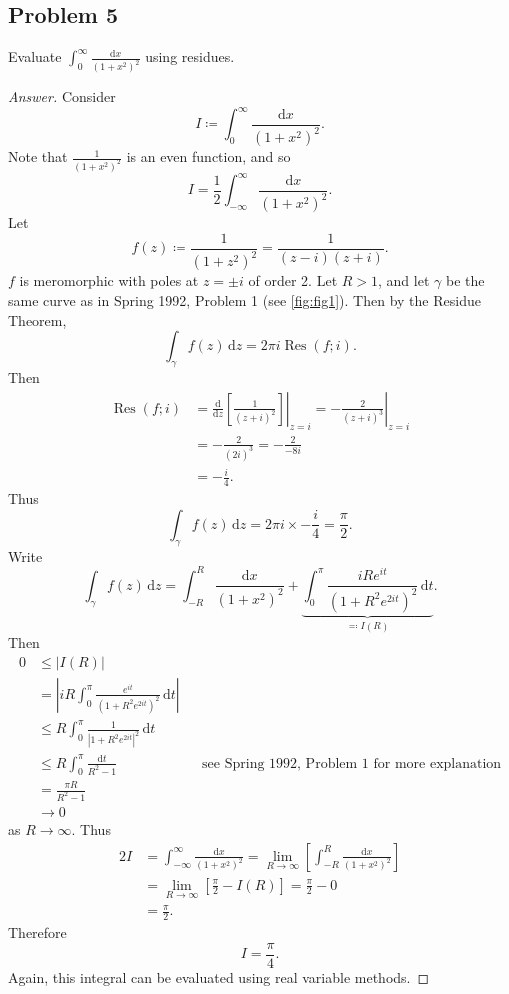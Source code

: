 \documentclass[12pt]{article}
\newcommand\paren[1]{\left( #1 \right)}
\newcommand{\sqbrack}[1]{\left [ #1 \right ]}
\theoremstyle{definition}
\DeclareMathOperator\Res{Res}
\begin{document}
\subsection{Problem 5}
Evaluate $\displaystyle \int_0^{\infty} \frac{\mathrm{d}x}{(1+x^2)^2}$ using residues.
\begin{proof}[Answer]
    Consider 
    \[
        I \coloneqq \int_0^{\infty} \frac{ \mathrm{d}x }{ \paren{ 1 + x^2 }^2 }.
    \]
    Note that $\frac{1}{ \paren{ 1 + x^2 }^2 }$ is an even function, and so 
    \[
        I = \frac{1}{2} \int_{-\infty}^{\infty} \frac{ \mathrm{d}x }{ \paren{ 1 + x^2 }^2 }.
    \]
    Let 
    \[
        f(z) \coloneqq \frac{1}{ \paren{ 1 + z^2 }^2 } = \frac{1}{(z - i)(z + i)}.
    \]
    $f$ is meromorphic with poles at $z = \pm i$ of order 2. Let $R > 1$, and let $\gamma$ be the same curve as in Spring 1992, Problem 1 (see \ref{fig:fig1}). Then by the Residue Theorem,
    \[
        \int_{\gamma} f(z) \, \mathrm{d}z = 2\pi i \Res(f;i).
    \]
    Then 
    \begin{align*}
        \Res(f;i) & = \frac{ \mathrm{d} }{ \mathrm{d} z} \left. \sqbrack{ \frac{1}{(z+i)^2} } \right|_{ z = i } = \left. -\frac{2}{(z+i)^3} \right|_{z = i} \\
        & = -\frac{2}{(2i)^3} = -\frac{2}{-8i} \\
        & = -\frac{i}{4}.
    \end{align*}
    Thus 
    \[
        \int_{\gamma} f(z) \, \mathrm{d}z = 2\pi i \times -\frac{i}{4} = \frac{\pi}{2}.
    \]
    Write
    \[
        \int_{\gamma} f(z) \, \mathrm{d}z = \int_{-R}^R \frac{ \mathrm{d}x }{ \paren{ 1 + x^2 }^2 } + \underbrace{ \int_0^{\pi} \frac{ iRe^{it} }{ \paren{ 1 + R^2e^{2it} }^2 } \, \mathrm{d}t }_{ \eqqcolon I(R) }.
    \]
    Then 
    \begin{align*}
        0 & \leq |I(R)| \\
        & = \left| iR \int_0^{\pi} \frac{ e^{it} }{ \paren{ 1 + R^2e^{2it} }^2 } \, \mathrm{d}t \right| \\
        & \leq R \int_0^{\pi} \frac{1}{ \left| 1 + R^2e^{2it} \right|^2 } \, \mathrm{d}t \\
        & \leq R \int_0^{\pi} \frac{ \mathrm{d}t }{R^2 - 1} && \text{see Spring 1992, Problem 1 for more explanation} \\
        & = \frac{ \pi R }{ R^2 - 1 } \\
        & \to 0
    \end{align*}
    as $R \to \infty$. Thus 
    \begin{align*}
        2I & = \int_{-\infty}^{\infty} \frac{ \mathrm{d}x }{ \paren{ 1 + x^2 }^2 } = \lim\limits_{R \to \infty} \sqbrack{ \int_{-R}^R \frac{ \mathrm{d}x }{ \paren{ 1 + x^2 }^2 } } \\
        & = \lim\limits_{R \to \infty} \sqbrack{ \frac{\pi}{2} - I(R) } = \frac{\pi}{2} - 0 \\
        & = \frac{\pi}{2}.
    \end{align*}
    Therefore 
    \[
        I = \boxed{ \frac{\pi}{4}. }
    \]
    Again, this integral can be evaluated using real variable methods.
\end{proof}
\end{document}
